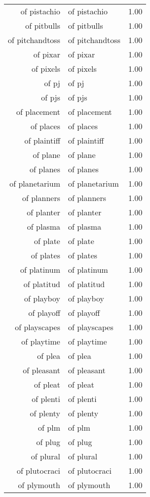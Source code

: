 \begin{table}[ht]
\begin{tabular}{rlr}
  of pistachio & of pistachio & 1.00 \\ 
  of pitbulls & of pitbulls & 1.00 \\ 
  of pitchandtoss & of pitchandtoss & 1.00 \\ 
  of pixar & of pixar & 1.00 \\ 
  of pixels & of pixels & 1.00 \\ 
  of pj & of pj & 1.00 \\ 
  of pjs & of pjs & 1.00 \\ 
  of placement & of placement & 1.00 \\ 
  of places & of places & 1.00 \\ 
  of plaintiff & of plaintiff & 1.00 \\ 
  of plane & of plane & 1.00 \\ 
  of planes & of planes & 1.00 \\ 
  of planetarium & of planetarium & 1.00 \\ 
  of planners & of planners & 1.00 \\ 
  of planter & of planter & 1.00 \\ 
  of plasma & of plasma & 1.00 \\ 
  of plate & of plate & 1.00 \\ 
  of plates & of plates & 1.00 \\ 
  of platinum & of platinum & 1.00 \\ 
  of platitud & of platitud & 1.00 \\ 
  of playboy & of playboy & 1.00 \\ 
  of playoff & of playoff & 1.00 \\ 
  of playscapes & of playscapes & 1.00 \\ 
  of playtime & of playtime & 1.00 \\ 
  of plea & of plea & 1.00 \\ 
  of pleasant & of pleasant & 1.00 \\ 
  of pleat & of pleat & 1.00 \\ 
  of plenti & of plenti & 1.00 \\ 
  of plenty & of plenty & 1.00 \\ 
  of plm & of plm & 1.00 \\ 
  of plug & of plug & 1.00 \\ 
  of plural & of plural & 1.00 \\ 
  of plutocraci & of plutocraci & 1.00 \\ 
  of plymouth & of plymouth & 1.00 \\ 

\end{tabular}
\end{table}
